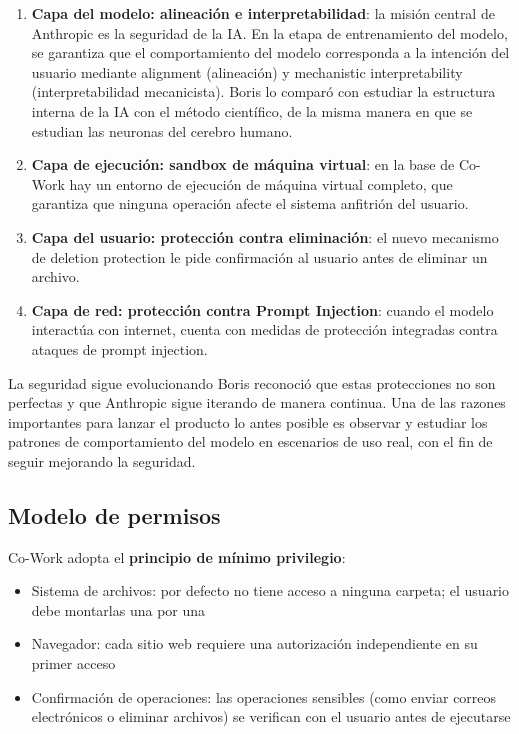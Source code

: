 \documentclass[a4paper]{article}
\begin{document}
\begin{enumerate}
    \item \textbf{Capa del modelo: alineación e interpretabilidad}: la misión central de Anthropic es la seguridad de la IA. En la etapa de entrenamiento del modelo, se garantiza que el comportamiento del modelo corresponda a la intención del usuario mediante alignment (alineación) y mechanistic interpretability (interpretabilidad mecanicista). Boris lo comparó con estudiar la estructura interna de la IA con el método científico, de la misma manera en que se estudian las neuronas del cerebro humano.

    \item \textbf{Capa de ejecución: sandbox de máquina virtual}: en la base de Co-Work hay un entorno de ejecución de máquina virtual completo, que garantiza que ninguna operación afecte el sistema anfitrión del usuario.

    \item \textbf{Capa del usuario: protección contra eliminación}: el nuevo mecanismo de deletion protection le pide confirmación al usuario antes de eliminar un archivo.

    \item \textbf{Capa de red: protección contra Prompt Injection}: cuando el modelo interactúa con internet, cuenta con medidas de protección integradas contra ataques de prompt injection.
\end{enumerate}

\begin{warningbox}{La seguridad sigue evolucionando}
Boris reconoció que estas protecciones no son perfectas y que Anthropic sigue iterando de manera continua. Una de las razones importantes para lanzar el producto lo antes posible es observar y estudiar los patrones de comportamiento del modelo en escenarios de uso real, con el fin de seguir mejorando la seguridad.
\end{warningbox}

\subsection{Modelo de permisos}

Co-Work adopta el \textbf{principio de mínimo privilegio}:

\begin{itemize}
    \item Sistema de archivos: por defecto no tiene acceso a ninguna carpeta; el usuario debe montarlas una por una
    \item Navegador: cada sitio web requiere una autorización independiente en su primer acceso
    \item Confirmación de operaciones: las operaciones sensibles (como enviar correos electrónicos o eliminar archivos) se verifican con el usuario antes de ejecutarse
\end{itemize}
\end{document}
